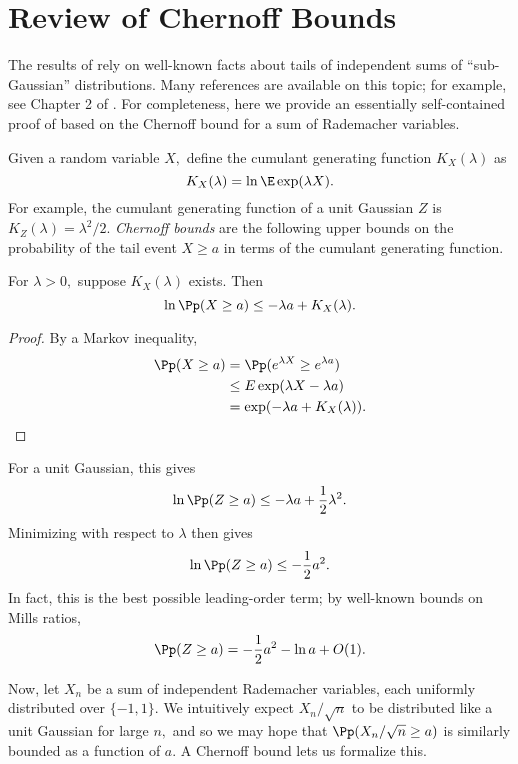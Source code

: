 \section{Review of Chernoff Bounds \label{appendix:chernoff}}

The results of  rely on well-known facts about tails of independent sums of ``sub-Gaussian'' distributions. Many references are available on this topic; for example, see Chapter 2 of \cite{vershynin_high-dimensional_2018}. For completeness, here we provide an essentially self-contained proof of  based on the Chernoff bound for a sum of Rademacher variables.

Given a random variable $X,$ define the cumulant generating function $K_X(\lambda)$ as
$$
K_X(\lambda) = \ln \E \exp(\lambda X).
$$
For example, the cumulant generating function of a unit Gaussian $Z$ is $K_Z(\lambda) = \lambda^2 / 2.$  \textit{Chernoff bounds} are the following upper bounds on the probability of the tail event $X \ge a$ in terms of the cumulant generating function.

\begin{proposition}
For $\lambda > 0,$ suppose $K_X(\lambda)$ exists. Then
$$
\ln \Pp(X \ge a) \le - \lambda a + K_X(\lambda).
$$
\end{proposition}
\begin{proof}
By a Markov inequality,
\begin{align*}
\Pp(X \ge a) &= \Pp(e^{\lambda X} \ge e^{\lambda a}) \\
        & \le E \exp(\lambda X - \lambda a) \\
              &= \exp(-\lambda a + K_X(\lambda)).
\end{align*}
\end{proof}
For a unit Gaussian, this gives
$$
\ln \Pp(Z \ge a) \le - \lambda a + \frac{1}{2} \lambda^2.
$$
Minimizing with respect to $\lambda$ then gives
$$
\ln \Pp(Z \ge a) \le - \frac{1}{2} a^2.
$$
In fact, this is the best possible leading-order term; by well-known bounds on Mills ratios,
$$
\Pp(Z \ge a) = - \frac 1 2 a^2 - \ln a + O(1).
$$

Now, let $X_n$ be a sum of independent Rademacher variables, each uniformly distributed over $\{-1, 1\}.$ We intuitively expect $X_n / \sqrt{n}$ to be distributed like a unit Gaussian for large $n,$ and so we may hope that $\Pp(X_n/\sqrt n \ge a)$ is similarly bounded as a function of $a.$ A Chernoff bound lets us formalize this.

